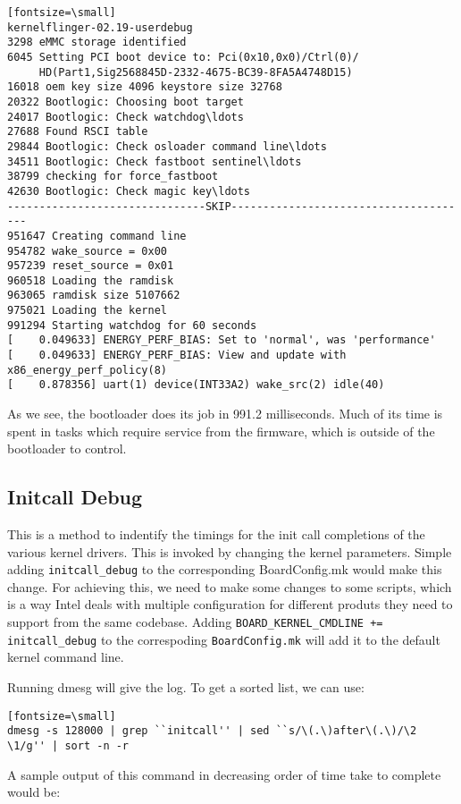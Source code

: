 \begin{verbatim}[fontsize=\small]
kernelflinger-02.19-userdebug
3298 eMMC storage identified
6045 Setting PCI boot device to: Pci(0x10,0x0)/Ctrl(0)/
     HD(Part1,Sig2568845D-2332-4675-BC39-8FA5A4748D15)
16018 oem key size 4096 keystore size 32768
20322 Bootlogic: Choosing boot target
24017 Bootlogic: Check watchdog\ldots
27688 Found RSCI table
29844 Bootlogic: Check osloader command line\ldots
34511 Bootlogic: Check fastboot sentinel\ldots
38799 checking for force_fastboot
42630 Bootlogic: Check magic key\ldots
-------------------------------SKIP--------------------------------------
951647 Creating command line
954782 wake_source = 0x00
957239 reset_source = 0x01
960518 Loading the ramdisk
963065 ramdisk size 5107662
975021 Loading the kernel
991294 Starting watchdog for 60 seconds
[    0.049633] ENERGY_PERF_BIAS: Set to 'normal', was 'performance'
[    0.049633] ENERGY_PERF_BIAS: View and update with x86_energy_perf_policy(8)
[    0.878356] uart(1) device(INT33A2) wake_src(2) idle(40)
\end{verbatim}

As we see, the bootloader does its job in 991.2 milliseconds.
Much of its time is spent in tasks which require service from the
firmware, which is outside of the bootloader to control.

\subsection {Initcall Debug}

This is a method to indentify the timings for the init call completions
of the various kernel drivers. This is invoked by changing the kernel
parameters. Simple adding \texttt{initcall\_debug} to the corresponding
BoardConfig.mk would make this change. For achieving this, we need
to make some changes to some scripts, which is a way Intel deals with
multiple configuration for different produts they need to support from
the same codebase. Adding \texttt{BOARD\_KERNEL\_CMDLINE += initcall\_debug}
to the correspoding \texttt{BoardConfig.mk} will add it to the default
kernel command line.

Running dmesg will give the log. To get a sorted list, we can use:
\begin{verbatim}[fontsize=\small]
dmesg -s 128000 | grep ``initcall'' | sed ``s/\(.\)after\(.\)/\2 \1/g'' | sort -n -r
\end{verbatim}

A sample output of this command in decreasing order of time take to complete would be:

